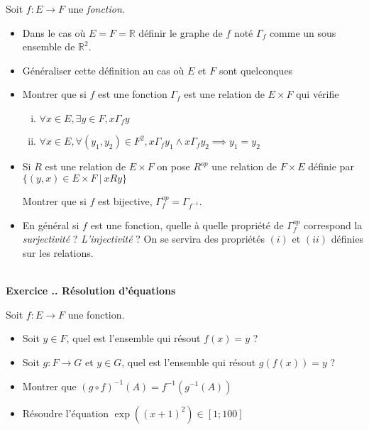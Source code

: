 \documentclass{article}
\newcommand{\mb}[1]{\mathbb{#1}}
\newcounter{exo}
\newcommand{\exercice}[1][\null]{\textbf{\\ Exercice \thesection.\theexo. #1} \addtocounter{exo}{1}}
\begin{document}
Soit $f : E \to F$ une \emph{fonction}.

\begin{itemize}
    \item Dans le cas où $E = F = \mb{R}$ 
        définir le graphe de $f$ noté $\Gamma_f$ 
        comme un sous ensemble de $\mb{R}^2$.

    \item Généraliser cette définition 
        au cas où $E$ et $F$ sont quelconques 

    \item Montrer que si $f$ est une fonction 
        $\Gamma_f$ est une relation de $E \times F$ 
        qui vérifie
        \begin{enumerate}[(i)]
            \item $\forall x \in E, \exists y \in F, x \Gamma_f y$
            \item $\forall x \in E, \forall (y_1,y_2) \in F^2, 
                x \Gamma_f y_1 \wedge x \Gamma_f y_2 \implies 
                y_1 = y_2$
        \end{enumerate}

    \item Si $R$ est une relation de $E \times F$
        on pose $R^{op}$ une relation de $F \times E$
        définie par $\{ (y,x) \in E\times F ~|~ x R y \}$

        Montrer que si $f$ est bijective, $\Gamma_f^{op} = \Gamma_{f^{-1}}$.

    \item En général si $f$ est une fonction, quelle 
        à quelle propriété de $\Gamma_f^{op}$ correspond la 
        \emph{surjectivité} ? \emph{L'injectivité} ? On 
        se servira des propriétés $(i)$ et $(ii)$ définies 
        sur les relations.
\end{itemize}


\exercice[Résolution d'équations]

Soit $f : E \to F$ une fonction.

\begin{itemize}
    \item Soit $y \in F$, quel est l'ensemble 
        qui résout $f(x) = y$ ?

    \item Soit $g : F \to G$ et $y \in G$, quel
        est l'ensemble qui résout $g(f(x)) = y$ ?

    \item Montrer que $(g \circ f)^{-1}(A) = f^{-1} (g^{-1} (A))$

    \item Résoudre l'équation $\exp ((x + 1)^2) \in [1; 100]$

\end{itemize}
\end{document}
